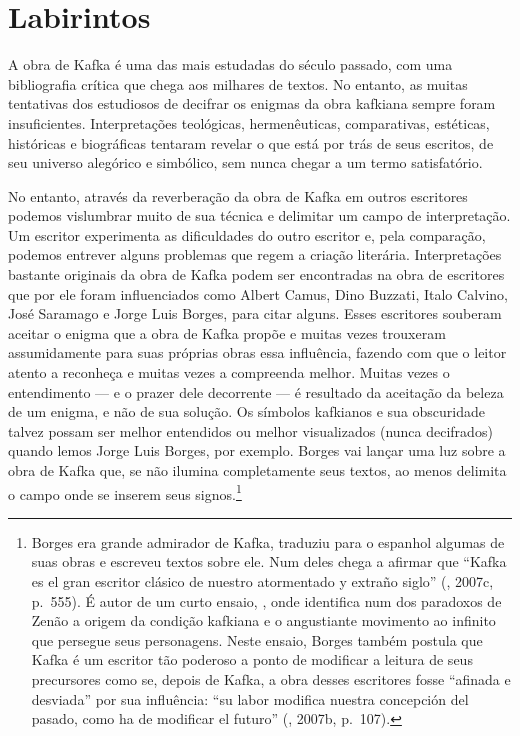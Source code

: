 \chapter{Labirintos}

A obra de Kafka é uma das mais estudadas do século passado, com uma
bibliografia crítica que chega aos milhares de textos. No entanto, as
muitas tentativas dos estudiosos de decifrar os enigmas da obra kafkiana
sempre foram insuficientes. Interpretações teológicas, hermenêuticas,
comparativas, estéticas, históricas e biográficas tentaram revelar o
que está por trás de seus escritos, de seu universo alegórico e
simbólico, sem nunca chegar a um termo satisfatório.

No entanto, através da reverberação da obra de Kafka em outros
escritores podemos vislumbrar muito de sua técnica e delimitar um campo
de interpretação. Um escritor experimenta as dificuldades do outro
escritor e, pela comparação, podemos entrever alguns problemas que regem
a criação literária. Interpretações bastante originais da obra de Kafka
podem ser encontradas na obra de escritores que por ele foram
influenciados como Albert Camus, Dino Buzzati, Italo Calvino, José
Saramago e Jorge Luis Borges, para citar alguns. Esses escritores
souberam aceitar o enigma que a obra de Kafka propõe e muitas vezes
trouxeram assumidamente para suas próprias obras essa influência,
fazendo com que o leitor atento a reconheça e muitas vezes a compreenda
melhor. Muitas vezes o entendimento --- e o prazer dele decorrente --- é
resultado da aceitação da beleza de um enigma, e não de sua solução. Os
símbolos kafkianos e sua obscuridade talvez possam ser melhor entendidos
ou melhor visualizados (nunca decifrados) quando lemos Jorge Luis
Borges, por exemplo. Borges vai lançar uma luz sobre a obra de Kafka
que, se não ilumina completamente seus textos, ao menos delimita o campo
onde se inserem seus signos.\footnote{Borges era grande admirador de
  Kafka, traduziu para o espanhol algumas de suas obras e escreveu
  textos sobre ele. Num deles chega a afirmar que ``Kafka es el gran
  escritor clásico de nuestro atormentado y extraño siglo'' (,
  2007c, p.~555). É autor de um curto ensaio, {}, onde identifica num dos paradoxos de Zenão a origem da
  condição kafkiana e o angustiante movimento ao infinito que persegue
  seus personagens. Neste ensaio, Borges também postula que Kafka é um
  escritor tão poderoso a ponto de modificar a leitura de seus
  precursores como se, depois de Kafka, a obra desses escritores fosse
  ``afinada e desviada'' por sua influência: ``su labor modifica nuestra
  concepción del pasado, como ha de modificar el futuro'' (,
  2007b, p.~107).}

